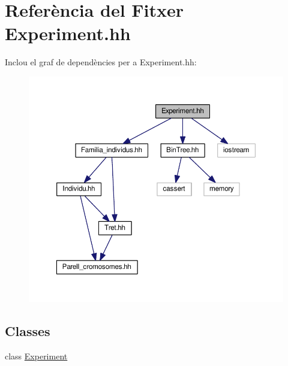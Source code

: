 \hypertarget{_experiment_8hh}{}\section{Referència del Fitxer Experiment.\+hh}
\label{_experiment_8hh}
Inclou el graf de dependències per a Experiment.\+hh\+:
\nopagebreak
\begin{figure}[H]
\begin{center}
\leavevmode
\includegraphics[width=350pt]{_experiment_8hh__incl}
\end{center}
\end{figure}
\subsection*{Classes}
\begin{DoxyCompactItemize}
\item 
class \hyperlink{class_experiment}{Experiment}
\end{DoxyCompactItemize}
